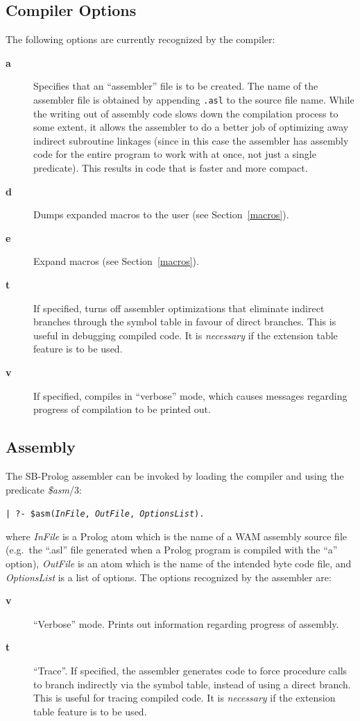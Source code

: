 \subsection{Compiler Options}\label{compiler_options}
The following options are currently recognized by the compiler:
\begin{description}
\item[{\bf a}] Specifies that an ``assembler'' file is to be created.
    The name of the assembler file is obtained by appending {\tt .asl}
    to the source file name.
    While the writing out of assembly code slows down the compilation process
    to some extent, it allows the assembler to do a better job of optimizing
    away indirect subroutine linkages (since in this case the assembler has
    assembly code for the entire program to work with at once, not just a single
    predicate).
    This results in code that is faster and more compact.
\item[{\bf d}] Dumps expanded macros to the user (see Section~\ref{macros}).
\item[{\bf e}] Expand macros (see Section~\ref{macros}).
\item[{\bf t}] If specified, turns off assembler optimizations that eliminate
    indirect branches through the symbol table in favour of direct branches.
    This is useful in debugging compiled code.
    It is {\em necessary} if the extension table feature is to be used.
\item[{\bf v}] If specified, compiles in ``verbose'' mode,
    which causes messages regarding progress of compilation to be printed out.
\end{description}

\subsection{Assembly}
The SB-Prolog assembler can be invoked by loading the compiler and using the
predicate {\em \$asm}/3:
\begin{center}
{\tt | ?- \$asm({\em InFile}, {\em OutFile}, {\em OptionsList}).}
\end{center}
where {\em InFile} is a Prolog atom which is the name of a WAM
assembly source file
(e.g.\ the ``.asl'' file generated when a Prolog program is compiled
with the ``a'' option),
{\em OutFile} is an atom which is the name of the intended byte code file,
and {\em OptionsList} is a list of options.
The options recognized by the assembler are:
\begin{description}
\item[{\bf v}] ``Verbose'' mode.
    Prints out information regarding progress of assembly.
\item[{\bf t}] ``Trace''.
    If specified, the assembler generates code to force procedure calls
    to branch indirectly via the symbol table, instead of using a direct branch.
    This is useful for tracing compiled code.
    It is {\em necessary} if the extension table feature is to be used.
\end{description}


